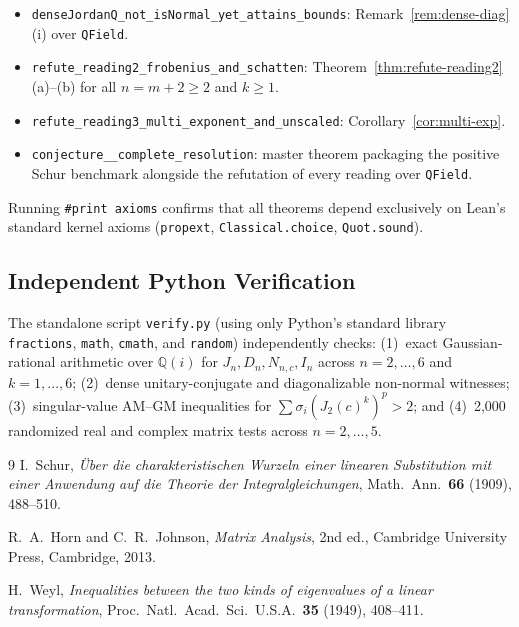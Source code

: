 \documentclass[11pt,a4paper]{article}
\newcommand{\ust}{\_\allowbreak}
\theoremstyle{plain}
\theoremstyle{definition}
\newcommand{\Q}{\mathbb{Q}}
\begin{document}
{\begin{itemize}
\begin{itemize}
    \item \texttt{denseJordanQ\ust not\ust isNormal\ust yet\ust attains\ust bounds}: Remark~\ref{rem:dense-diag}(i) over \texttt{QField}.
    \item \texttt{refute\ust reading2\ust frobenius\ust and\ust schatten}: Theorem~\ref{thm:refute-reading2}(a)--(b) for all $n = m + 2 \ge 2$ and $k \ge 1$.
    \item \texttt{refute\ust reading3\ust multi\ust exponent\ust and\ust unscaled}: Corollary~\ref{cor:multi-exp}.
    \item \texttt{conjecture\ust 00000007168\ust complete\ust resolution}: master theorem packaging the positive Schur benchmark alongside the refutation of every reading over \texttt{QField}.
  \end{itemize}
\end{itemize}
}
Running \texttt{\#print axioms} confirms that all theorems depend exclusively on Lean's standard kernel axioms (\texttt{propext}, \texttt{Classical.choice}, \texttt{Quot.sound}).

\subsection{Independent Python Verification}
The standalone script \texttt{verify.py} (using only Python's standard library \texttt{fractions}, \texttt{math}, \texttt{cmath}, and \texttt{random}) independently checks: (1)~exact Gaussian-rational arithmetic over $\Q(i)$ for $J_n, D_n, N_{n,c}, I_n$ across $n = 2,\dots,6$ and $k = 1,\dots,6$; (2)~dense unitary-conjugate and diagonalizable non-normal witnesses; (3)~singular-value AM--GM inequalities for $\sum \sigma_i(J_2(c)^k)^p > 2$; and (4)~2,000 randomized real and complex matrix tests across $n = 2,\dots,5$.

\begin{thebibliography}{9}
I.~Schur, \emph{\"Uber die charakteristischen Wurzeln einer linearen Substitution mit einer Anwendung auf die Theorie der Integralgleichungen}, Math.\ Ann.\ \textbf{66} (1909), 488--510.

R.~A.~Horn and C.~R.~Johnson, \emph{Matrix Analysis}, 2nd ed., Cambridge University Press, Cambridge, 2013.

H.~Weyl, \emph{Inequalities between the two kinds of eigenvalues of a linear transformation}, Proc.\ Natl.\ Acad.\ Sci.\ U.S.A.\ \textbf{35} (1949), 408--411.
\end{thebibliography}
\end{document}
